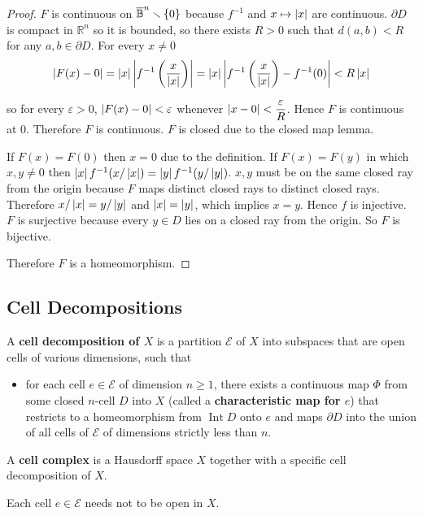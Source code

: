 \begin{proof}
	$F$ is continuous on $\overline{\mathbb{B}}^{n}\smallsetminus\left\{{0}\right\}$ because $f^{-1}$ and $x\mapsto \left\vert{x}\right\vert$ are continuous. $\partial D$ is compact in $\mathbb{R}^{n}$ so it is bounded, so there exists $R > 0$ such that $d(a, b) < R$ for any $a, b \in \partial D$. For every $x \ne 0$
	\begin{align*}
		\left\vert{F(x) - 0}\right\vert = \left\vert{x}\right\vert\left\vert{f^{-1}\left(\frac{x}{\left\vert{x}\right\vert}\right)}\right\vert = \left\vert{x}\right\vert\left\vert{f^{-1}\left(\frac{x}{\left\vert{x}\right\vert}\right) - f^{-1}(0)}\right\vert < R\left\vert{x}\right\vert
	\end{align*}

	so for every $\varepsilon > 0$, $\left\vert{F(x) - 0}\right\vert < \varepsilon$ whenever $\left\vert{x - 0}\right\vert < \dfrac{\varepsilon}{R}$. Hence $F$ is continuous at $0$. Therefore $F$ is continuous. $F$ is closed due to the closed map lemma.

	If $F(x) = F(0)$ then $x = 0$ due to the definition. If $F(x) = F(y)$ in which $x, y\ne 0$ then $\left\vert{x}\right\vert f^{-1}(x/\left\vert{x}\right\vert) = \left\vert{y}\right\vert f^{-1}(y/\left\vert{y}\right\vert)$. $x, y$ must be on the same closed ray from the origin because $F$ maps distinct closed rays to distinct closed rays. Therefore $x/\left\vert{x}\right\vert = y/\left\vert{y}\right\vert$ and $\left\vert{x}\right\vert = \left\vert{y}\right\vert$, which implies $x = y$. Hence $f$ is injective. $F$ is surjective because every $y\in D$ lies on a closed ray from the origin. So $F$ is bijective.

	Therefore $F$ is a homeomorphism.
\end{proof}

\subsection{Cell Decompositions}

A \textbf{cell decomposition of $X$} is a partition $\mathscr{E}$ of $X$ into subspaces that are open cells of various dimensions, such that
\begin{itemize}
	\item for each cell $e \in \mathscr{E}$ of dimension $n\geq 1$, there exists a continuous map $\Phi$ from some closed $n$-cell $D$ into $X$ (called a \textbf{characteristic map for $e$}) that restricts to a homeomorphism from $\operatorname{Int} D$ onto $e$ and maps $\partial D$ into the union of all cells of $\mathscr{E}$ of dimensions strictly less than $n$.
\end{itemize}

A \textbf{cell complex} is a Hausdorff space $X$ together with a specific cell decomposition of $X$.

Each cell $e \in \mathscr{E}$ needs not to be open in $X$.

